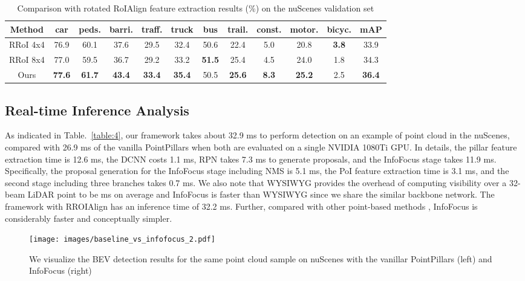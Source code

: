 \documentclass[runningheads]{llncs}
\begin{document}
\begin{table}[h!]
\centering
\caption{Comparison with rotated RoIAlign feature extraction results (\%) on the nuScenes validation set}
\begin{tabular}{c c c c c c c c c c c c} 
 \hline
 Method & car & peds. & barri. & traff. & truck & bus & trail. & const. & motor. & bicyc. & mAP \\ [0.5ex] 
 \hline
  RRoI 4x4 & 76.9 & 60.1 & 37.6 & 29.5 & 32.4 & 50.6 & 22.4 & 5.0 & 20.8 & \bf 3.8 & 33.9\\
  RRoI 8x4 & 77.0 & 59.5 & 36.7 & 29.2 & 33.2 & \bf 51.5 & 25.4 & 4.5 & 24.0 & 1.8 & 34.3\\ 
  \hline
  Ours & \bf 77.6 & \bf 61.7 & \bf 43.4 & \bf 33.4 & \bf 35.4 & 50.5 & \bf 25.6 & \bf 8.3 & \bf 25.2 & 2.5 & \bf 36.4 \\ 
 \hline
\end{tabular}
\label{table:5}
\end{table}

\subsection{Real-time Inference Analysis}
As indicated in Table.~\ref{table:4}, our framework takes about 32.9 ms to perform detection on an example of point cloud in the nuScenes, compared with 26.9 ms of the vanilla PointPillars when both are evaluated on a single NVIDIA 1080Ti GPU. In details, the pillar feature extraction time is 12.6 ms, the DCNN costs 1.1 ms, RPN takes 7.3 ms to generate proposals, and the InfoFocus stage takes 11.9 ms. Specifically, the proposal generation for the InfoFocus stage including NMS is 5.1 ms, the PoI feature extraction time is 3.1 ms, and the second stage including three branches takes 0.7 ms. We also note that WYSIWYG \cite{hu2019you} provides the overhead of computing visibility over a 32-beam LiDAR point to be  ms on average and InfoFocus is faster than WYSIWYG \cite{hu2019you} since we share the similar backbone network. The framework with RROIAlign has an inference time of 32.2 ms. Further, compared with other point-based methods \cite{shi2019pointrcnn,yang2019std}, InfoFocus is considerably faster and conceptually simpler. 

\begin{figure}[t]
\centering
  \texttt{[image: images/baseline\_vs\_infofocus\_2.pdf]}
  \\
  \caption{We visualize the BEV detection results for the same point cloud sample on nuScenes with the vanillar PointPillars (left) and InfoFocus (right)}
\label{fig:comparison}
\end{figure}
\end{document}
